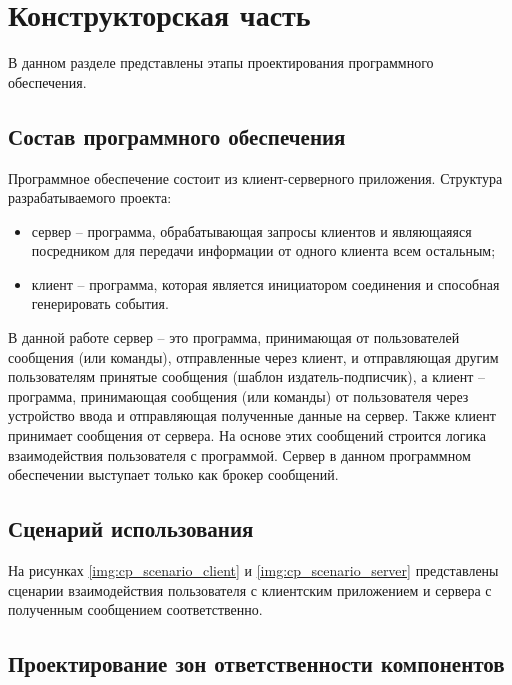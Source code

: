 \chapter{Конструкторская часть}

В данном разделе представлены этапы проектирования программного обеспечения.

\section{Состав программного обеспечения}

Программное обеспечение состоит из клиент-серверного приложения. Структура разрабатываемого проекта:

\begin{itemize}
	\item сервер -- программа, обрабатывающая запросы клиентов и являющаяяся посредником для передачи информации от одного клиента всем остальным;
	\item клиент -- программа, которая является инициатором соединения и способная генерировать события.
\end{itemize}

В данной работе сервер -- это программа, принимающая от пользователей сообщения (или команды), отправленные через клиент, и отправляющая другим пользователям принятые сообщения (шаблон издатель-подписчик), а клиент -- программа, принимающая сообщения (или команды) от пользователя через устройство ввода и отправляющая полученные данные на сервер. Также клиент принимает сообщения от сервера. На основе этих сообщений строится логика взаимодействия пользователя с программой. Сервер в данном программном обеспечении выступает только как брокер сообщений.

\section{Сценарий использования}

На рисунках \ref{img:cp_scenario_client} и \ref{img:cp_scenario_server}  представлены сценарии взаимодействия пользователя с клиентским приложением и сервера с полученным сообщением соответственно.



\section{Проектирование зон ответственности компонентов}

